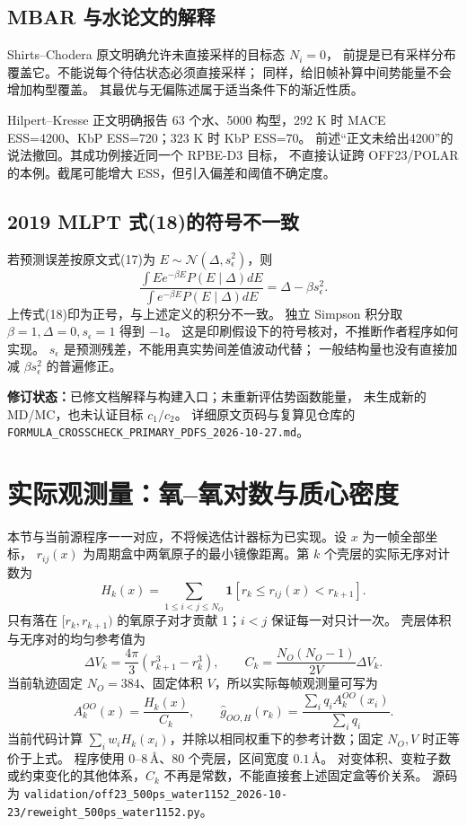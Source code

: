 \documentclass[11pt,a4paper]{article}
\begin{document}
\subsection{MBAR 与水论文的解释}
Shirts--Chodera 原文明确允许未直接采样的目标态 $N_i=0$，
前提是已有采样分布覆盖它。不能说每个待估状态必须直接采样；
同样，给旧帧补算中间势能量不会增加构型覆盖。
其最优与无偏陈述属于适当条件下的渐近性质。

Hilpert--Kresse 正文明确报告 63 个水、5000 构型，292 K 时
MACE ESS=4200、KbP ESS=720；323 K 时 KbP ESS=70。
前述“正文未给出4200”的说法撤回。其成功例接近同一个 RPBE-D3 目标，
不直接认证跨 OFF23/POLAR 的本例。截尾可能增大 ESS，但引入偏差和阈值不确定度。

\subsection{2019 MLPT 式(18)的符号不一致}
若预测误差按原文式(17)为 $E\sim\mathcal N(\Delta,s_\epsilon^2)$，则
\begin{equation}
\frac{\int E e^{-\beta E}P(E\mid\Delta)dE}
{\int e^{-\beta E}P(E\mid\Delta)dE}=\Delta-\beta s_\epsilon^2.
\end{equation}
上传式(18)印为正号，与上述定义的积分不一致。
独立 Simpson 积分取 $\beta=1,\Delta=0,s_\epsilon=1$ 得到 $-1$。
这是印刷假设下的符号核对，不推断作者程序如何实现。
$s_\epsilon$ 是预测残差，不能用真实势间差值波动代替；
一般结构量也没有直接加减 $\beta s_\epsilon^2$ 的普遍修正。

\textbf{修订状态：}已修文档解释与构建入口；未重新评估势函数能量，
未生成新的 MD/MC，也未认证目标 $c_1/c_2$。
详细原文页码与复算见仓库的
\texttt{FORMULA\_CROSSCHECK\_PRIMARY\_PDFS\_2026-10-27.md}。

\newpage
\section{实际观测量：氧--氧对数与质心密度}
本节与当前源程序一一对应，不将候选估计器标为已实现。设 $x$ 为一帧全部坐标，
$r_{ij}(x)$ 为周期盒中两氧原子的最小镜像距离。第 $k$ 个壳层的实际无序对计数为
\begin{equation}
H_k(x)=\sum_{1\le i<j\le N_O}
\mathbf 1\!\left[r_k\le r_{ij}(x)<r_{k+1}\right].
\end{equation}
只有落在 $[r_k,r_{k+1})$ 的氧原子对才贡献 1；$i<j$ 保证每一对只计一次。
壳层体积与无序对的均匀参考值为
\begin{equation}
\Delta V_k=\frac{4\pi}{3}(r_{k+1}^3-r_k^3),\qquad
C_k=\frac{N_O(N_O-1)}{2V}\Delta V_k.
\end{equation}
当前轨迹固定 $N_O=384$、固定体积 $V$，所以实际每帧观测量可写为
\begin{equation}\boxed{
A_k^{OO}(x)=\frac{H_k(x)}{C_k},\qquad
\hat g_{OO,H}(r_k)=\frac{\sum_iq_iA_k^{OO}(x_i)}{\sum_iq_i}.}
\end{equation}
当前代码计算 $\sum_iw_i H_k(x_i)$，并除以相同权重下的参考计数；固定 $N_O,V$ 时正等价于上式。
程序使用 $0$--$8\,\text{\AA}$、80 个壳层，区间宽度 $0.1\,\text{\AA}$。
对变体积、变粒子数或约束变化的其他体系，$C_k$ 不再是常数，不能直接套上述固定盒等价关系。
源码为 \texttt{validation/off23\_500ps\_water1152\_2026-10-23/\allowbreak reweight\_500ps\_water1152.py}。
\end{document}
